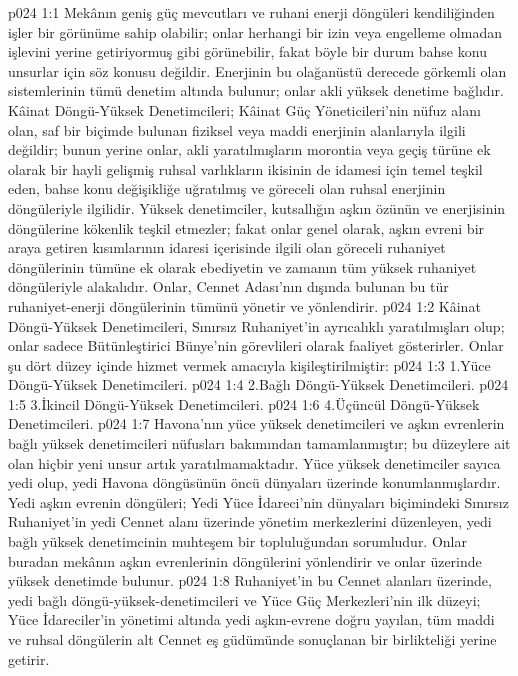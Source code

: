 \vs p024 1:1 Mekânın geniş güç mevcutları ve ruhani enerji döngüleri kendiliğinden işler bir görünüme sahip olabilir; onlar herhangi bir izin veya engelleme olmadan işlevini yerine getiriyormuş gibi görünebilir, fakat böyle bir durum bahse konu unsurlar için söz konusu değildir. Enerjinin bu olağanüstü derecede görkemli olan sistemlerinin tümü denetim altında bulunur; onlar akli yüksek denetime bağlıdır. Kâinat Döngü\hyp{}Yüksek Denetimcileri; Kâinat Güç Yöneticileri’nin nüfuz alanı olan, saf bir biçimde bulunan fiziksel veya maddi enerjinin alanlarıyla ilgili değildir; bunun yerine onlar, akli yaratılmışların morontia veya geçiş türüne ek olarak bir hayli gelişmiş ruhsal varlıkların ikisinin de idamesi için temel teşkil eden, bahse konu değişikliğe uğratılmış ve göreceli olan ruhsal enerjinin döngüleriyle ilgilidir. Yüksek denetimciler, kutsallığın aşkın özünün ve enerjisinin döngülerine kökenlik teşkil etmezler; fakat onlar genel olarak, aşkın evreni bir araya getiren kısımlarının idaresi içerisinde ilgili olan göreceli ruhaniyet döngülerinin tümüne ek olarak ebediyetin ve zamanın tüm yüksek ruhaniyet döngüleriyle alakalıdır. Onlar, Cennet Adası’nın dışında bulunan bu tür ruhaniyet\hyp{}enerji döngülerinin tümünü yönetir ve yönlendirir.
\vs p024 1:2 Kâinat Döngü\hyp{}Yüksek Denetimcileri, Sınırsız Ruhaniyet’in ayrıcalıklı yaratılmışları olup; onlar sadece Bütünleştirici Bünye’nin görevlileri olarak faaliyet gösterirler. Onlar şu dört düzey içinde hizmet vermek amacıyla kişileştirilmiştir:
\vs p024 1:3 1.\bibnobreakspace Yüce Döngü\hyp{}Yüksek Denetimcileri.
\vs p024 1:4 2.\bibnobreakspace Bağlı Döngü\hyp{}Yüksek Denetimcileri.
\vs p024 1:5 3.\bibnobreakspace İkincil Döngü\hyp{}Yüksek Denetimcileri.
\vs p024 1:6 4.\bibnobreakspace Üçüncül Döngü\hyp{}Yüksek Denetimcileri.
\vs p024 1:7 Havona’nın yüce yüksek denetimcileri ve aşkın evrenlerin bağlı yüksek denetimcileri nüfusları bakımından tamamlanmıştır; bu düzeylere ait olan hiçbir yeni unsur artık yaratılmamaktadır. Yüce yüksek denetimciler sayıca yedi olup, yedi Havona döngüsünün öncü dünyaları üzerinde konumlanmışlardır. Yedi aşkın evrenin döngüleri; Yedi Yüce İdareci’nin dünyaları biçimindeki Sınırsız Ruhaniyet’in yedi Cennet alanı üzerinde yönetim merkezlerini düzenleyen, yedi bağlı yüksek denetimcinin muhteşem bir topluluğundan sorumludur. Onlar buradan mekânın aşkın evrenlerinin döngülerini yönlendirir ve onlar üzerinde yüksek denetimde bulunur.
\vs p024 1:8 Ruhaniyet’in bu Cennet alanları üzerinde, yedi bağlı döngü\hyp{}yüksek\hyp{}denetimcileri ve Yüce Güç Merkezleri’nin ilk düzeyi; Yüce İdareciler’in yönetimi altında yedi aşkın\hyp{}evrene doğru yayılan, tüm maddi ve ruhsal döngülerin alt Cennet eş güdümünde sonuçlanan bir birlikteliği yerine getirir.
